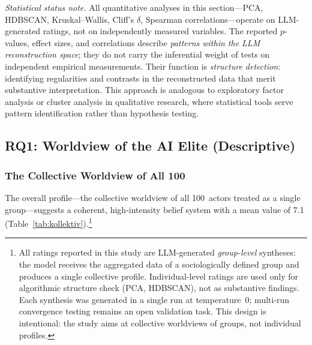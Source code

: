 \documentclass[12pt,a4paper]{article}
\begin{document}
\emph{Statistical status note.} All quantitative analyses in this section---PCA, HDBSCAN, Kruskal--Wallis, Cliff's $\delta$, Spearman correlations---operate on LLM-generated ratings, not on independently measured variables. The reported $p$-values, effect sizes, and correlations describe \emph{patterns within the LLM reconstruction space}; they do not carry the inferential weight of tests on independent empirical measurements. Their function is \emph{structure detection}: identifying regularities and contrasts in the reconstructed data that merit substantive interpretation. This approach is analogous to exploratory factor analysis or cluster analysis in qualitative research, where statistical tools serve pattern identification rather than hypothesis testing.


\subsection{RQ1: Worldview of the AI Elite (Descriptive)}
\label{sec:ergebnisse:f1}

\subsubsection{The Collective Worldview of All 100}

The overall profile---the collective worldview of all 100~actors treated as a single group---suggests a coherent, high-intensity belief system with a mean value of 7.1 (Table~\ref{tab:kollektiv}).\footnote{All ratings reported in this study are LLM-generated \emph{group-level} syntheses: the model receives the aggregated data of a sociologically defined group and produces a single collective profile. Individual-level ratings are used only for algorithmic structure check (PCA, HDBSCAN), not as substantive findings. Each synthesis was generated in a single run at temperature~0; multi-run convergence testing remains an open validation task. This design is intentional: the study aims at collective worldviews of groups, not individual profiles.}
\end{document}
